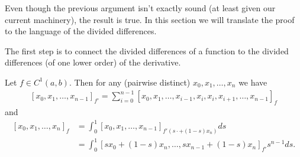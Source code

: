 Even though the previous argument isn't exactly sound (at least given our current machinery), the result is true. In this section we will translate the proof to the language of the divided differences.

The first step is to connect the divided differences of a function to the divided differences (of one lower order) of the derivative.

\begin{lem}
	Let $f \in C^{1}(a, b)$. Then for any (pairwise distinct) $x_{0}, x_{1}, \ldots, x_{n}$ we have
	\begin{align}\label{derivative_divdif}
		[x_{0}, x_{1}, \ldots, x_{n - 1}]_{f'} = \sum_{i = 0}^{n - 1} [x_{0}, x_{1}, \ldots, x_{i - 1}, x_{i}, x_{i}, x_{i + 1}, \ldots, x_{n - 1}]_{f}
	\end{align}
	and
	\begin{align}\label{integral_divdif}
		[x_{0}, x_{1}, \ldots, x_{n}]_{f} &= \int_{0}^{1} [x_{0}, x_{1}, \ldots, x_{n - 1}]_{f'(s \cdot + (1 - s) x_{n})} ds \\
		&= \int_{0}^{1} [s x_{0} + (1 - s) x_{n}, \ldots, s x_{n - 1} + (1 - s) x_{n}]_{f'} s^{n - 1} d s \nonumber.
	\end{align}
\end{lem}
